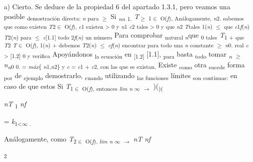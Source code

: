 \documentclass[12pt]{article}
\renewcommand{\_}{\kern-1.5pt\textunderscore\kern-1.5pt}
\begin{document}
\begin{justify}
{\fontsize{10pt}{12.0pt}\selectfont a) Cierto. Se deduce de la propiedad 6 del apartado 1.3.1, pero veamos una posible \textsubscript{demostración directa: \textit{n }para $ \geq $  }Si \textit{\textsubscript{nn }}\textsubscript{1. }\textit{T}\textsubscript{$ \geq $  1$ \in $ O(\textit{f}), Análogamente, \textit{n}2. sabemos que como existen \textit{T}2$ \in $ O(\textit{f}), \textit{c}1 existen > 0 y \textit{n}1 \textit{c}2 tales > 0 y que \textit{n}2 \textit{T}tales 1(\textit{n}) $ \leq $  que \textit{c}1\textit{f}(\textit{n}) \textit{T}2(\textit{n}) para $ \leq $  \textit{c}[1.1] todo 2\textit{f}(\textit{n}) un número }Para comprobar \textsubscript{natural \textit{n}}que \textsubscript{0 tales }\textit{T}\textsubscript{1 + que \textit{T}2 \textit{T}$ \in $ O(\textit{f}), 1(\textit{n}) + debemos \textit{T}2(\textit{n}) $ \leq $  \textit{cf}(\textit{n}) encontrar para todo una \textit{n }constante $ \geq $  \textit{n}0. real \textit{c }> [1.2] 0 y verifica }Apoyándonos \textsubscript{la ecuación }en \textsubscript{[1.2] }[1.1], \textsubscript{para }basta \textsubscript{todo }tomar \textit{\textsubscript{n }}\textsubscript{$ \geq $  }\textit{n\textsubscript{n}}\textsubscript{0 0. = \textit{máx}$ \{ $ \textit{n}1,\textit{n}2$ \} $  y \textit{c }= \textit{c}1 + \textit{c}2, con las que se existan, }Existe \textsubscript{como }otra \textsubscript{sucede }forma \textsubscript{por }de \textsubscript{ejemplo }demostrarlo, \textsubscript{cuando }utilizando \textsubscript{las funciones }límites \textsubscript{son continuas: }en caso de que estos Si \textit{T}\textsubscript{1$ \in $ O(\textit{f}), entonces \textit{lim n }$\infty$ $ \rightarrow $  })(\textsubscript{)( }\par}
\end{justify}\par

\textit{nT }\textsubscript{1 }\textit{nf }\par

{\fontsize{10pt}{12.0pt}\selectfont = \textit{k}\textsubscript{1<$\infty$ . }\par}\par

{\fontsize{10pt}{12.0pt}\selectfont Análogamente, como \textit{T}\textsubscript{2$ \in $  O(\textit{f}), \textit{lim n }$\infty$ $ \rightarrow $  }\textit{nT nf }\par}\par

\textsubscript{2 }\par
\end{document}
